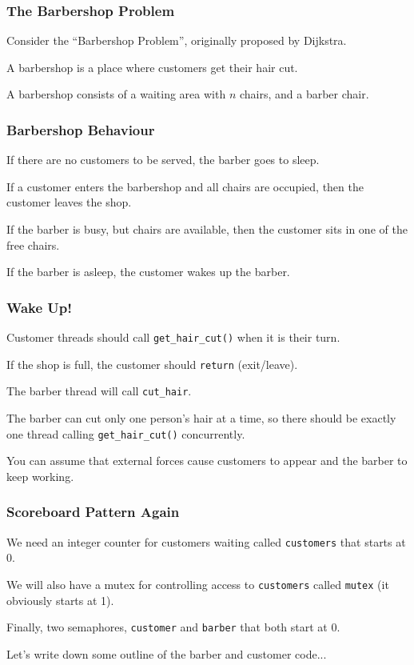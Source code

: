 \begin{frame}
\frametitle{The Barbershop Problem}

Consider the ``Barbershop Problem'', originally proposed by Dijkstra.

A barbershop is a place where customers get their hair cut. 

A barbershop consists of a waiting area with $n$ chairs, and a barber chair.

\end{frame}


\begin{frame}
\frametitle{Barbershop Behaviour}

If there are no customers to be served, the barber goes to sleep. 

If a customer enters the barbershop and all chairs are occupied, then the customer leaves the shop. 

If the barber is busy, but chairs are available, then the customer sits in one of the free chairs. 

If the barber is asleep, the customer wakes up the barber. 

\end{frame}

\begin{frame}
\frametitle{Wake Up!}

Customer threads should call \texttt{get\_hair\_cut()} when it is their turn. 
 
If the shop is full, the customer should \texttt{return} (exit/leave). 

The barber thread will call \texttt{cut\_hair}.

The barber can cut only one person's hair at a time, so there should be exactly one thread calling \texttt{get\_hair\_cut()} concurrently. 

You can assume that external forces cause customers to appear and the barber to keep working.

\end{frame}


\begin{frame}
\frametitle{Scoreboard Pattern Again}


We need an integer counter for customers waiting called \texttt{customers} that starts at 0. 

We will also have a mutex for controlling access to \texttt{customers} called \texttt{mutex} (it obviously starts at 1). 

Finally, two semaphores, \texttt{customer} and \texttt{barber} that both start at 0.

Let's write down some outline of the barber and customer code...

\end{frame}


